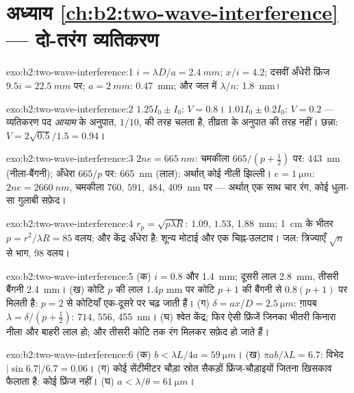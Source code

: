 \section*{अध्याय \ref{ch:b2:two-wave-interference} --- दो-तरंग व्यतिकरण}

\begin{solution}{exo:b2:two-wave-interference:1}
$i = \lambda D/a = \qty{2.4}{mm}$; $x/i = 4.2$; दसवीं अँधेरी फ्रिंज $9.5i = \qty{22.5}{mm}$ पर;
$a = \qty{2}{mm}$: \qty{0.47}{mm}; और जल में $\lambda/n$: \qty{1.8}{mm}।
\end{solution}

\begin{solution}{exo:b2:two-wave-interference:2}
$1.25I_0 \pm I_0$: $V = 0.8$। $1.01I_0 \pm 0.2I_0$: $V = 0.2$ --- व्यतिकरण पद
\emph{आयाम} के अनुपात, $1/10$, की तरह चलता है, तीव्रता के अनुपात की तरह नहीं। छन्ना:
$V = 2\sqrt{0.5}/1.5 = 0.94$।
\end{solution}

\begin{solution}{exo:b2:two-wave-interference:3}
$2ne = \qty{665}{nm}$: चमकीला $665/(p + \tfrac12)$ पर: \qty{443}{nm} (नीला-बैंगनी);
अँधेरा $665/p$ पर: \qty{665}{nm} (लाल): अर्थात् कोई नीली झिल्ली। $e = \qty{1}{\micro m}$: $2ne = \qty{2660}{nm}$,
चमकीला $760$, $591$, $484$, \qty{409}{nm} पर --- अर्थात् एक साथ चार रंग, कोई
धुला-सा गुलाबी सफ़ेद।
\end{solution}

\begin{solution}{exo:b2:two-wave-interference:4}
$r_p = \sqrt{p\lambda R}$: $1.09$, $1.53$, \qty{1.88}{mm}; \qty{1}{cm} के भीतर $p = r^2/\lambda R = 85$
वलय; और केंद्र अँधेरा है: शून्य मोटाई और एक चिह्न-उलटाव। जल:
त्रिज्याएँ $\sqrt n$ से भाग, $98$ वलय।
\end{solution}

\begin{solution}{exo:b2:two-wave-interference:5}
(क) $i = 0.8$ और \qty{1.4}{mm}; दूसरी लाल \qty{2.8}{mm}, तीसरी बैंगनी \qty{2.4}{mm}।
(ख) कोटि $p$ की लाल $1.4p$ mm पर कोटि $p + 1$ की बैंगनी से $0.8(p + 1)$ पर मिलती है:
$p = 2$ से कोटियाँ एक-दूसरे पर चढ़ जाती हैं। (ग) $\delta = ax/D = \qty{2.5}{\micro m}$: ग़ायब $\lambda = \delta/(p +
\tfrac12)$: $714$, $556$, \qty{455}{nm}। (घ) श्वेत केंद्र; फिर ऐसी फ्रिंजें जिनका
भीतरी किनारा नीला और बाहरी लाल हो; और तीसरी कोटि तक रंग
मिलकर सफ़ेद हो जाते हैं।
\end{solution}

\begin{solution}{exo:b2:two-wave-interference:6}
(क) $b < \lambda L/4a = \qty{59}{\micro m}$। (ख) $\pi ab/\lambda L = 6.7$: विभेद $|\sin6.7|/6.7
= 0.06$। (ग) कोई सेंटीमीटर चौड़ा स्रोत सैकड़ों फ्रिंज-चौड़ाइयों जितना
खिसकाव फैलाता है: कोई फ्रिंज नहीं। (घ) $a < \lambda/\theta = \qty{61}{\micro m}$।
\end{solution}

